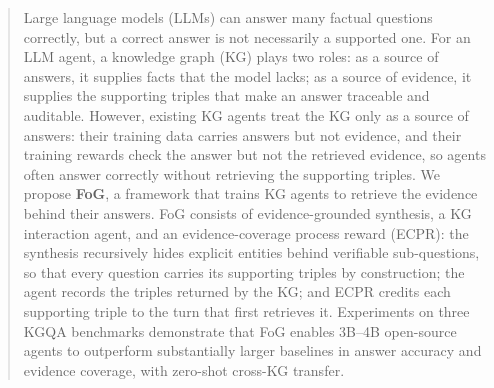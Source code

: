 \begin{abstract}
Large language models (LLMs) can answer many factual questions correctly, but a correct answer is not necessarily a supported one. For an LLM agent, a knowledge graph (KG) plays two roles: as a source of answers, it supplies facts that the model lacks; as a source of evidence, it supplies the supporting triples that make an answer traceable and auditable. However, existing KG agents treat the KG only as a source of answers: their training data carries answers but not evidence, and their training rewards check the answer but not the retrieved evidence, so agents often answer correctly without retrieving the supporting triples. We propose \textbf{FoG}, a framework that trains KG agents to retrieve the evidence behind their answers. FoG consists of evidence-grounded synthesis, a KG interaction agent, and an evidence-coverage process reward (ECPR): the synthesis recursively hides explicit entities behind verifiable sub-questions, so that every question carries its supporting triples by construction; the agent records the triples returned by the KG; and ECPR credits each supporting triple to the turn that first retrieves it. Experiments on three KGQA benchmarks demonstrate that FoG enables 3B--4B open-source agents to outperform substantially larger baselines in answer accuracy and evidence coverage, with zero-shot cross-KG transfer.
\end{abstract}
